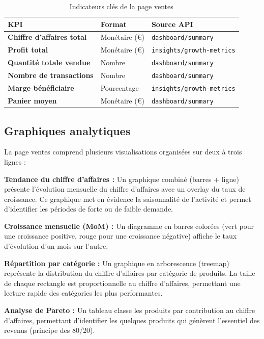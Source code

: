 \documentclass[12pt,a4paper,twoside]{report}
\begin{document}
\begin{table}[H]
\centering
{}
\begin{tabularx}{\textwidth}{>{\bfseries}p{3.5cm}p{2.5cm}X}
\toprule
\rowcolor{TableHeader}
\color{white}KPI & \color{white}Format & \color{white}Source API \\
\midrule
Chiffre d'affaires total & Monétaire (€) & \texttt{dashboard/summary} \\
Profit total & Monétaire (€) & \texttt{insights/growth-metrics} \\
Quantité totale vendue & Nombre & \texttt{dashboard/summary} \\
Nombre de transactions & Nombre & \texttt{dashboard/summary} \\
Marge bénéficiaire & Pourcentage & \texttt{insights/growth-metrics} \\
Panier moyen & Monétaire (€) & \texttt{dashboard/summary} \\
\bottomrule
\end{tabularx}
\caption{Indicateurs clés de la page ventes}
\label{tab:sales-kpis}
\end{table}

\subsection{Graphiques analytiques}

La page ventes comprend plusieurs visualisations organisées sur deux à trois lignes :

\textbf{Tendance du chiffre d'affaires :} Un graphique combiné (barres + ligne) présente l'évolution mensuelle du chiffre d'affaires avec un overlay du taux de croissance. Ce graphique met en évidence la saisonnalité de l'activité et permet d'identifier les périodes de forte ou de faible demande.

\textbf{Croissance mensuelle (MoM) :} Un diagramme en barres colorées (vert pour une croissance positive, rouge pour une croissance négative) affiche le taux d'évolution d'un mois sur l'autre.

\textbf{Répartition par catégorie :} Un graphique en arborescence (treemap) représente la distribution du chiffre d'affaires par catégorie de produits. La taille de chaque rectangle est proportionnelle au chiffre d'affaires, permettant une lecture rapide des catégories les plus performantes.

\textbf{Analyse de Pareto :} Un tableau classe les produits par contribution au chiffre d'affaires, permettant d'identifier les quelques produits qui génèrent l'essentiel des revenus (principe des 80/20).
\end{document}
